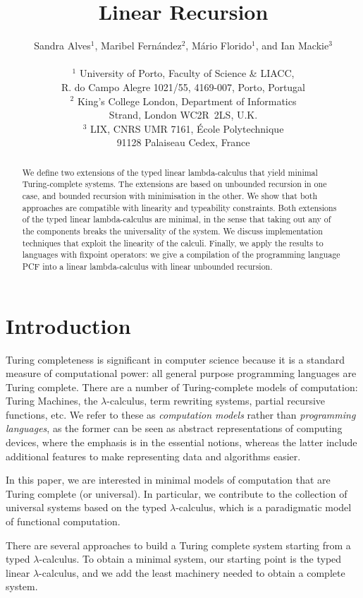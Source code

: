\documentclass{article}
\title{Linear Recursion}
\author{Sandra Alves$^1$, Maribel Fern\'andez$^2$, 
M\'{a}rio Florido$^1$, and Ian Mackie$^3$  \\\\
$^1$ University of Porto, Faculty of Science \& LIACC,\\ 
R. do Campo Alegre 1021/55, 4169-007, Porto, Portugal\\
$^2$ King's College London, Department of Informatics\\  
Strand, London WC2R~2LS, U.K. \\
$^3$ LIX, CNRS UMR 7161, \'Ecole Polytechnique\\ 
91128 Palaiseau Cedex, France
}
\date{}
\begin{document}
\maketitle


\begin{abstract}
We define two extensions of the typed linear lambda-calculus that
yield minimal Turing-complete systems. The extensions are based on
unbounded recursion in one case, and bounded recursion with
minimisation in the other. We show that both approaches are compatible
with linearity and typeability constraints. Both extensions of the
typed linear lambda-calculus are minimal, in the sense that taking out
any of the components breaks the universality of the system.  We
discuss implementation techniques that exploit the linearity of the
calculi.  Finally, we apply the results to languages with fixpoint
operators: we give a compilation of the programming language PCF into
a linear lambda-calculus with linear unbounded recursion.
\end{abstract}

\section{Introduction}
Turing completeness is significant in computer science because it is a
standard measure of computational power: all general purpose
programming languages are Turing complete.  There are a number of
Turing-complete models of computation: Turing Machines, the
$\lambda$-calculus, term rewriting systems, partial recursive
functions, etc.  We refer to these as \emph{computation models} rather
than \emph{programming languages}, as the former can be seen as
abstract representations of computing devices, where the emphasis is
in the essential notions, whereas the latter include additional
features to make representing data and algorithms easier.

In this paper, we are interested in minimal models of computation that
are Turing complete (or universal).  In particular, we contribute to
the collection of universal systems based on the typed
$\lambda$-calculus, which is a paradigmatic  model of functional
computation.

There are several approaches to build a Turing complete system
starting from a typed $\lambda$-calculus. To obtain a minimal system,
our starting point is the typed linear $\lambda$-calculus, and we
add the least machinery needed to obtain a complete
system.
\end{document}
